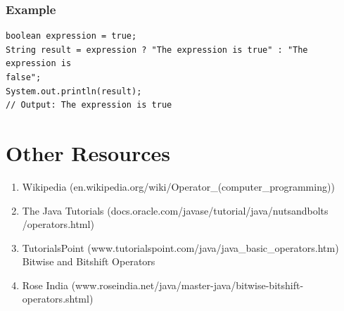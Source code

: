 \documentclass[a4paper]{article}
\begin{document}
\subsubsection*{Example}
\begin{lstlisting}
boolean expression = true;
String result = expression ? "The expression is true" : "The expression is
false";
System.out.println(result);
// Output: The expression is true

\end{lstlisting}


\newpage

\section*{Other Resources}
\begin{enumerate}

\item Wikipedia (en.wikipedia.org/wiki/Operator\_(computer\_programming))

\item The Java Tutorials (docs.oracle.com/javase/tutorial/java/nutsandbolts
/operators.html)

\item TutorialsPoint (www.tutorialspoint.com/java/java\_basic\_operators.htm) \\

Bitwise and Bitshift Operators

\item Rose India (www.roseindia.net/java/master-java/bitwise-bitshift-
operators.shtml)

\end{enumerate}
\end{document}
